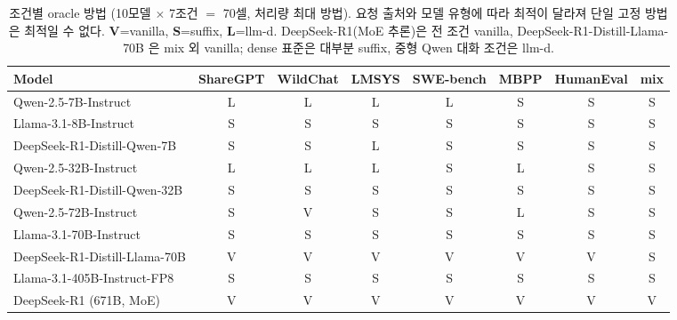 
\begin{table}[t]
\centering
\caption{조건별 oracle 방법 (10모델 $\times$ 7조건 $=$ 70셀, 처리량 최대 방법).
  요청 출처와 모델 유형에 따라 최적이 달라져 단일 고정 방법은 최적일 수 없다.
  \textbf{V}=vanilla, \textbf{S}=suffix, \textbf{L}=llm-d.
  DeepSeek-R1(MoE 추론)은 전 조건 vanilla, DeepSeek-R1-Distill-Llama-70B 은 mix 외 vanilla;
  dense 표준은 대부분 suffix, 중형 Qwen 대화 조건은 llm-d.}
\label{tbl:b200-oracle}
\scriptsize
\setlength{\tabcolsep}{5pt}
\begin{tabularx}{\textwidth}{@{}Xccccccc@{}}
\toprule
\textbf{Model} & \textbf{ShareGPT} & \textbf{WildChat} & \textbf{LMSYS} &
  \textbf{SWE-bench} & \textbf{MBPP} & \textbf{HumanEval} & \textbf{mix} \\
\midrule
Qwen-2.5-7B-Instruct          & L & L & L & L & S & S & S \\
Llama-3.1-8B-Instruct         & S & S & S & S & S & S & S \\
DeepSeek-R1-Distill-Qwen-7B   & S & S & L & S & S & S & S \\
Qwen-2.5-32B-Instruct         & L & L & L & S & L & S & S \\
DeepSeek-R1-Distill-Qwen-32B  & S & S & S & S & S & S & S \\
Qwen-2.5-72B-Instruct         & S & V & S & S & L & S & S \\
Llama-3.1-70B-Instruct        & S & S & S & S & S & S & S \\
DeepSeek-R1-Distill-Llama-70B & V & V & V & V & V & V & S \\
Llama-3.1-405B-Instruct-FP8   & S & S & S & S & S & S & S \\
DeepSeek-R1 (671B, MoE)       & V & V & V & V & V & V & V \\
\bottomrule
\end{tabularx}
\end{table}
